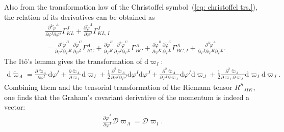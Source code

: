 \documentclass[aps, prd
, preprint
, nofootinbib 
, notitlepage
, longbibliography
]{revtex4-1}
\newcommand{\pdif}[2]{\frac{\partial #1}{\partial #2}}
\newcommand{\ppdpdpd}[3]{\frac{\partial^2 #1}{\partial #2\partial #3}}
\newcommand{\pppdpdpdpd}[4]{\frac{\partial^3 #1}{\partial #2\partial #3\partial #4}}
\newcommand{\dd}{\mathrm{d}}
\newcommand{\calD}{\mathcal{D}}
\newcommand{\bae}[1]{\begin{align} #1 \end{align}}
\begin{document}
Also from the transformation law of the Christoffel symbol~(\ref{eq: christoffel trs.}), the relation of its derivatives can be obtained as
\bae{
	&\ppdpdpd{\tilde{\varphi}^A}{\varphi^I}{\varphi^J}\Gamma^J_{KL}+\pdif{\tilde{\varphi}^A}{\varphi^J}\Gamma^J_{KL,I} \nonumber \\
	&=\ppdpdpd{\tilde{\varphi}^B}{\varphi^I}{\varphi^K}\pdif{\tilde{\varphi}^C}{\varphi^L}\Gamma^A_{BC}
	+\pdif{\tilde{\varphi}^B}{\varphi^K}\ppdpdpd{\tilde{\varphi}^C}{\varphi^I}{\varphi^L}\Gamma^A_{BC}
	+\pdif{\tilde{\varphi}^B}{\varphi^K}\pdif{\tilde{\varphi}^C}{\varphi^L}\Gamma^A_{BC,I}+\pppdpdpdpd{\tilde{\varphi}^A}{\varphi^I}{\varphi^K}{\varphi^L}.
}
The It\^o's lemma gives the transformation of $\dd\varpi_I$:
\bae{
	\dd\tilde{\varpi}_A=\pdif{\tilde{\varpi}_A}{\varphi^I}\dd\varphi^I+\pdif{\tilde{\varpi}_A}{\varpi_I}\dd\varpi_I
	+\frac{1}{2}\ppdpdpd{\tilde{\varpi}_A}{\varphi^I}{\varphi^J}\dd\varphi^I\dd\varphi^J+\ppdpdpd{\tilde{\varpi}_A}{\varphi^I}{\varpi_J}\dd\varphi^I\dd\varpi_J
	+\frac{1}{2}\ppdpdpd{\tilde{\varpi}_A}{\varpi_I}{\varpi_J}\dd\varpi_I\dd\varpi_J.
}
Combining them and the tensorial transformation of the Riemann tensor $R^S{}_{JIK}$, one finds that the Graham's covariant derivative of the momentum is indeed a vector:
\bae{
	\pdif{\tilde{\varphi}^A}{\varphi^I}\calD\varpi_A=\calD\varpi_I.
}


















\end{document}
